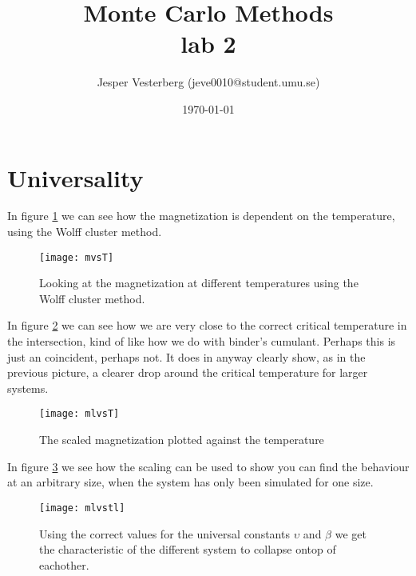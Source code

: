 \documentclass[11pt]{article}
\title{Monte Carlo Methods \\ lab 2}
\author{Jesper Vesterberg (jeve0010@student.umu.se)}
\date{\today}
\begin{document}
\begin{titlepage}
  \maketitle
  \thispagestyle{fancy}
  \rhead{\today}
  \begin{abstract}

  \end{abstract}
\end{titlepage}

\lhead{\theauthor}
\rhead{\thetitle\\\today}
\cfoot{\thepage}



\begin{thebibliography}{9}
\end{thebibliography}

\section{Universality}
In figure \ref{fig:mvsT} we can see how the magnetization is dependent on the temperature, using
the Wolff cluster method.
\begin{figure}[H]
	\centering
	\texttt{[image: mvsT]}
	\caption{Looking at the magnetization at different temperatures using the Wolff cluster
method.}
	\label{fig:mvsT}
\end{figure}

\newpage
In figure \ref{fig:mlvsT} we can see how we are very close to the correct critical temperature in the
intersection, kind of like how we do with binder’s cumulant. Perhaps this is just an
coincident, perhaps not. It does in anyway clearly show, as in the previous picture, a
clearer drop around the critical temperature for larger systems.
\begin{figure}[H]
	\centering
	\texttt{[image: mlvsT]}
	\caption{The scaled magnetization plotted against the temperature}
	\label{fig:mlvsT}
\end{figure}

\newpage
In figure \ref{fig:mlvstl} we see how the scaling can be used to show you can find the behaviour at
an arbitrary size, when the system has only been simulated for one size.
\begin{figure}[H]
	\centering
	\texttt{[image: mlvstl]}
	\caption{Using the correct values for the universal constants $\upsilon$ and $\beta$ we get the
characteristic of the different system to collapse ontop of eachother.}
	\label{fig:mlvstl}
\end{figure}
\end{document}

